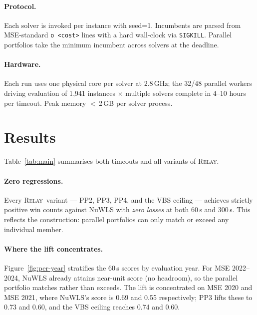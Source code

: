 \documentclass[11pt,letterpaper]{article}
\newcommand{\RELAY}{\textsc{Relay}}
\begin{document}
\paragraph{Protocol.}  Each solver is invoked per instance with seed=1.  Incumbents are parsed from MSE-standard \texttt{o <cost>} lines with a hard wall-clock via \texttt{SIGKILL}.  Parallel portfolios take the minimum incumbent across solvers at the deadline.

\paragraph{Hardware.}  Each run uses one physical core per solver at 2.8\,GHz; the 32/48 parallel workers driving evaluation of 1{,}941 instances $\times$ multiple solvers complete in 4--10 hours per timeout.  Peak memory $<$\,2\,GB per solver process.

\section{Results}\label{sec:results}

Table~\ref{tab:main} summarises both timeouts and all variants of \RELAY.



\paragraph{Zero regressions.}  Every \RELAY\ variant --- PP2, PP3, PP4, and the VBS ceiling --- achieves strictly positive win counts against NuWLS with \emph{zero losses} at both 60\,s and 300\,s.  This reflects the construction: parallel portfolios can only match or exceed any individual member.

\paragraph{Where the lift concentrates.}  Figure~\ref{fig:per-year} stratifies the 60\,s scores by evaluation year.  For MSE 2022--2024, NuWLS already attains near-unit score (no headroom), so the parallel portfolio matches rather than exceeds.  The lift is concentrated on MSE 2020 and MSE 2021, where NuWLS's score is 0.69 and 0.55 respectively; PP3 lifts these to 0.73 and 0.60, and the VBS ceiling reaches 0.74 and 0.60.
\end{document}
